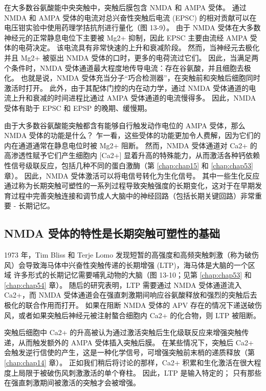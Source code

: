 在大多数谷氨酸能中央突触中，突触后膜包含 NMDA 和 AMPA 受体。 
通过 NMDA 和 AMPA 受体的电流对总兴奋性突触后电流 (EPSC) 的相对贡献可以在电压钳实验中使用药理学拮抗剂进行量化（图 13-9）。
由于 NMDA 受体在大多数神经元的正常静息电位下主要被 Mg2+ 抑制，因此 EPSC 主要由流经 AMPA 受体的电荷决定。 
该电流具有非常快速的上升和衰减阶段。 
然而，当神经元去极化并且 Mg2+ 被驱出 NMDA 受体的口时，更多的电荷流过它们。 
因此，当满足两个条件时，NMDA 受体通道最大程度地传导电流：存在谷氨酸，并且细胞去极化。 
也就是说，NMDA 受体充当分子“巧合检测器”，在突触前和突触后细胞同时激活时打开。
此外，由于其配体门控的内在动力学，通过 NMDA 受体通道的电流上升和衰减的时间进程比通过 AMPA 受体通道的电流慢得多。 
因此，NMDA 受体有助于 EPSC 和 EPSP 的晚期、缓慢期。


由于大多数谷氨酸能突触都含有能够自行触发动作电位的 AMPA 受体，那么 NMDA 受体的功能是什么？ 
乍一看，这些受体的功能更加令人费解，因为它们的内在通道通常在静息电位时被 Mg2+ 阻断。 然而，NMDA 受体通道对 Ca2+ 的高渗透性赋予它们产生细胞内 [Ca2+] 显着升高的特殊能力，从而激活各种钙依赖性信号级联反应，包括几种不同的蛋白激酶（第 \ref{chap:chap15} 和 \ref{chap:chap53} 章）。 
因此，NMDA 受体激活可以将电信号转化为生化信号。 其中一些生化反应通过称为长期突触可塑性的一系列过程导致突触强度的长期变化，这对于在早期发育过程中完善突触连接和调节成人大脑中的神经回路（包括长期关键回路）非常重要 - 长期记忆。



\subsection{NMDA 受体的特性是长期突触可塑性的基础}

1973 年，Tim Bliss 和 Terje Lomo 发现短暂的高强度和高频突触刺激（称为破伤风）会导致海马体中兴奋性突触传递的长期增强 (LTP)，海马体是大脑的一个区域 许多形式的长期记忆需要哺乳动物的大脑（图 13-10；见第 \ref{chap:chap53} 和 \ref{chap:chap54} 章）。 
随后的研究表明，LTP 需要通过 NMDA 受体通道流入 Ca2+，而 NMDA 受体通道会在强直刺激期间响应谷氨酸释放和强烈的突触后去极化的联合作用而打开。 
如果在阻断 NMDA 受体的 APV 存在的情况下递送破伤风，或者如果突触后神经元被注射螯合细胞内 Ca2+ 的化合物，则 LTP 被阻断。


突触后细胞中 Ca2+ 的升高被认为通过激活突触后生化级联反应来增强突触传递，从而触发额外的 AMPA 受体插入突触后膜。 
在某些情况下，突触后 Ca2+ 会触发逆行信使的产生，这是一种化学信号，可增强突触前末梢的递质释放（第 \ref{chap:chap14} 章）。
正如我们稍后将讨论的那样，Ca2+ 积累和生化激活在很大程度上局限于被破伤风刺激激活的单个脊柱。 因此，LTP 是输入特定的； 
只有那些在强直刺激期间被激活的突触才会被增强。


